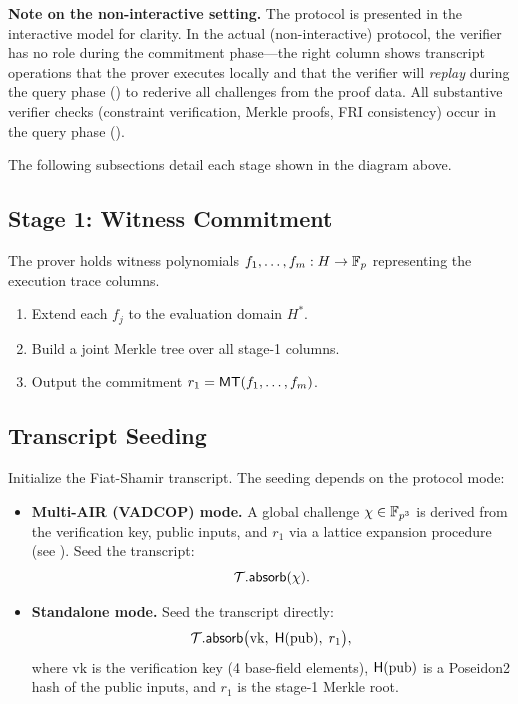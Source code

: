 \medskip
\noindent
\textbf{Note on the non-interactive setting.}
The protocol is presented in the interactive model for clarity.
In the actual (non-interactive) protocol, the verifier has no role
during the commitment phase---the right column shows transcript
operations that the prover executes locally and that the verifier
will \emph{replay} during the query phase ()
to rederive all challenges from the proof data.
All substantive verifier checks
(constraint verification, Merkle proofs, FRI consistency)
occur in the query phase ().

\medskip
The following subsections detail each stage shown in the diagram above.

\subsection{Stage 1: Witness Commitment}
\label{sec:stage1}

The prover holds witness polynomials $f_1, \ldots, f_m : H \to \mathbb{F}_p$
representing the execution trace columns.

\begin{enumerate}[label=(\roman*)]
  \item Extend each $f_j$ to the evaluation domain $H^*$.
  \item Build a joint Merkle tree over all stage-1 columns.
  \item Output the commitment $r_1 = \textsf{MT}(f_1, \ldots, f_m)$.
\end{enumerate}

\subsection{Transcript Seeding}
\label{sec:seed}

Initialize the Fiat-Shamir transcript.
The seeding depends on the protocol mode:

\begin{itemize}[nosep]
  \item \textbf{Multi-AIR (VADCOP) mode.}
        A global challenge $\chi \in \mathbb{F}_{p^3}$ is derived from
        the verification key, public inputs, and $r_1$
        via a lattice expansion procedure
        (see ).
        Seed the transcript:
        \[
          \mathcal{T}.\textsf{absorb}(\chi).
        \]

  \item \textbf{Standalone mode.}
        Seed the transcript directly:
        \[
          \mathcal{T}.\textsf{absorb}\bigl(\mathrm{vk},\; \textsf{H}(\mathrm{pub}),\; r_1\bigr),
        \]
        where $\mathrm{vk}$ is the verification key (4 base-field elements),
        $\textsf{H}(\mathrm{pub})$ is a Poseidon2 hash of the public inputs,
        and $r_1$ is the stage-1 Merkle root.
\end{itemize}

